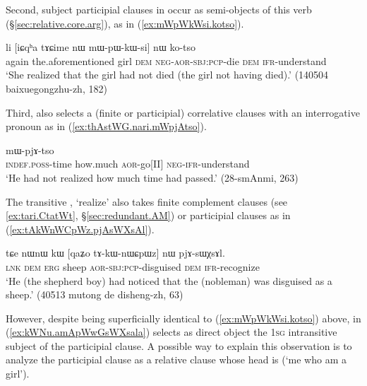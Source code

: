 Second, subject participial clauses in  occur as semi-objects of this verb (§\ref{sec:relative.core.arg}), as in (\ref{ex:mWpWkWsi.kotso}).

\begin{exe}
\ex \label{ex:mWpWkWsi.kotso}
\gll  li [iɕqʰa tɤɕime nɯ mɯ-pɯ-kɯ-si] nɯ ko-tso \\
again the.aforementioned girl \textsc{dem} \textsc{neg}-\textsc{aor}-\textsc{sbj}:\textsc{pcp}-die \textsc{dem} \textsc{ifr}-understand \\
\glt  `She realized that the girl had not died (the girl not having died).' (140504 baixuegongzhu-zh, 182)
\end{exe}

Third,  also selects a (finite or participial) correlative clauses with an interrogative pronoun as in (\ref{ex:thAstWG.nari.mWpjAtso}).

\begin{exe}
\ex \label{ex:thAstWG.nari.mWpjAtso}
 mɯ-pjɤ-tso \\
\textsc{indef}.\textsc{poss}-time how.much \textsc{aor}-go[II] \textsc{neg}-\textsc{ifr}-understand \\
\glt `He had not realized how much time had passed.' (28-smAnmi, 263)
\end{exe}

The transitive  , `realize' also takes finite complement clauses  (see \ref{ex:tari.CtatWt}, §\ref{sec:redundant.AM}) or participial clauses as in (\ref{ex:tAkWnWCpWz.pjAsWXsAl}).

\begin{exe}
\ex \label{ex:tAkWnWCpWz.pjAsWXsAl}
 \gll tɕe nɯnɯ kɯ [qaʑo tɤ-kɯ-nɯɕpɯz] nɯ pjɤ-sɯχsɤl. \\
 \textsc{lnk} \textsc{dem} \textsc{erg} sheep \textsc{aor}-\textsc{sbj}:\textsc{pcp}-disguised \textsc{dem} \textsc{ifr}-recognize \\
\glt `He (the shepherd boy) had noticed that the (nobleman) was disguised as a sheep.' (40513 mutong de disheng-zh, 63)
\end{exe}

However, despite being superficially identical to (\ref{ex:mWpWkWsi.kotso}) above, in (\ref{ex:kWNu.amApWwGsWXsala})  selects as direct object the \textsc{1sg}  intransitive subject  of the participial clause. A possible way to explain this observation is to analyze the participial clause  as a relative clause whose head is   (`me who am a girl').
 
